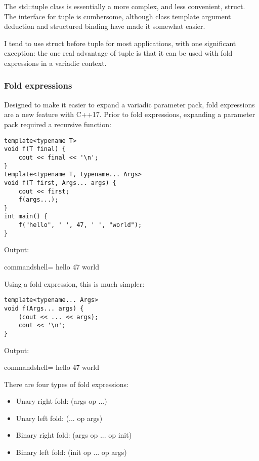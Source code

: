 
The std::tuple class is essentially a more complex, and less convenient, struct. The interface for tuple is cumbersome, although class template argument deduction and structured binding have made it somewhat easier.

I tend to use struct before tuple for most applications, with one significant exception: the one real advantage of tuple is that it can be used with fold expressions in a variadic context.

\subsubsection{Fold expressions}

Designed to make it easier to expand a variadic parameter pack, fold expressions are a new feature with C++17. Prior to fold expressions, expanding a parameter pack required a recursive function:

\begin{lstlisting}[style=styleCXX]
template<typename T>
void f(T final) {
	cout << final << '\n';
}
template<typename T, typename... Args>
void f(T first, Args... args) {
	cout << first;
	f(args...);
}
int main() {
	f("hello", ' ', 47, ' ', "world");
}
\end{lstlisting}

Output:

\begin{tcblisting}{commandshell={}}
hello 47 world
\end{tcblisting}

Using a fold expression, this is much simpler:

\begin{lstlisting}[style=styleCXX]
template<typename... Args>
void f(Args... args) {
	(cout << ... << args);
	cout << '\n';
}
\end{lstlisting}

Output:

\begin{tcblisting}{commandshell={}}
hello 47 world
\end{tcblisting}

There are four types of fold expressions:

\begin{itemize}
\item 
Unary right fold: (args op ...)

\item 
Unary left fold: (... op args)

\item 
Binary right fold: (args op ... op init)

\item 
Binary left fold: (init op ... op args)
\end{itemize}

